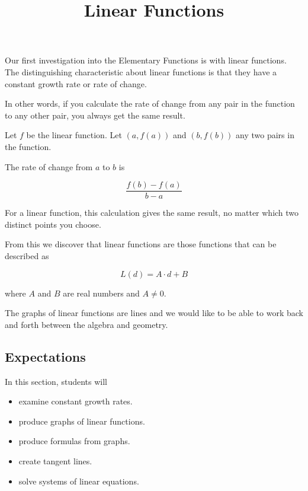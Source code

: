 \documentclass{ximera}
\title{Linear Functions}
\begin{document}
\begin{abstract}
\end{abstract}
\maketitle









Our first investigation into the Elementary Functions is with linear functions. The distinguishing characteristic about linear functions is that they have a constant growth rate or rate of change.  


In other words, if you calculate the rate of change from any pair in the function to any other pair, you always get the same result.

Let $f$ be the linear function.  Let $(a, f(a))$ and $(b, f(b))$ any two pairs in the function.

The rate of change from $a$ to $b$ is 

\[
\frac{f(b) - f(a)}{b-a}
\]


For a linear function, this calculation gives the same result, no matter which two distinct points you choose.













From this we discover that linear functions are those functions that can be described as

\[  L(d) = A \cdot d + B \]

where $A$ and $B$ are real numbers and $A \ne 0$.


The graphs of linear functions are lines and we would like to be able to work back and forth between the algebra and geometry.
















\subsection{Expectations}



\begin{sectionOutcomes}
In this section, students will 

\begin{itemize}
\item examine constant growth rates.
\item produce graphs of linear functions.
\item produce formulas from graphs.
\item create tangent lines.
\item solve systems of linear equations.
\end{itemize}
\end{sectionOutcomes}
\end{document}
